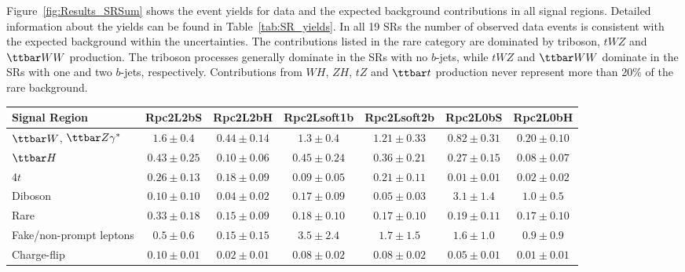 Figure~\ref{fig:Results_SRSum} shows the event yields for data and the expected background contributions 
in all signal regions. Detailed information about the yields can be found in Table~\ref{tab:SR_yields}.
In all 19 SRs the number of observed data events is consistent with the expected background within the uncertainties. 
The contributions listed in the rare category are dominated by triboson, $tWZ$ and $\ttbar WW$ production.
The triboson processes generally dominate in the SRs with no $b$-jets, while $tWZ$ and $\ttbar WW$
dominate in the SRs with one and two $b$-jets, respectively. Contributions from $WH$, $ZH$, $tZ$ and $\ttbar t$ production 
never represent more than 20\% of the rare background.

\begin{table}
\scriptsize
\begin{center}
\vspace*{-0.035\textwidth}
\begin{tabular}{|l|c|c|c|c|c|c|}
\hline
Signal Region                  & \textbf{Rpc2L2bS} & \textbf{Rpc2L2bH}    & \textbf{Rpc2Lsoft1b} &\textbf{Rpc2Lsoft2b}& \textbf{Rpc2L0bS} & \textbf{Rpc2L0bH}\\
\hline
\hline
$\ttbar W$, $\ttbar Z\gamma^*$ & $1.6\pm0.4$       & $0.44\pm0.14$     & $1.3\pm0.4$       & $1.21\pm0.33$       & $0.82\pm0.31$       & $0.20\pm0.10$  \\
$\ttbar H$                     & $0.43\pm0.25$     & $0.10\pm0.06$     & $0.45\pm0.24$     & $0.36\pm0.21$       & $0.27\pm0.15$       & $0.08\pm0.07$   \\
4$t$                           & $0.26\pm0.13$     & $0.18\pm0.09$     & $0.09\pm0.05$     & $0.21\pm0.11$       & $0.01\pm0.01$       & $0.02\pm0.02$   \\
Diboson                        & $0.10\pm0.10$     & $0.04\pm0.02$     & $0.17\pm0.09$     & $0.05\pm0.03$       & $3.1\pm1.4$         & $1.0\pm0.5$   \\
Rare                           & $0.33\pm0.18$     & $0.15\pm0.09$     & $0.18\pm0.10$     & $0.17\pm0.10$       & $0.19\pm0.11$       & $0.17\pm0.10$   \\
Fake/non-prompt leptons        & $0.5\pm0.6$       & $0.15\pm0.15$     & $3.5\pm2.4$       & $1.7\pm1.5$         & $1.6\pm1.0$         & $0.9\pm0.9$   \\
Charge-flip                    & $0.10\pm0.01$     & $0.02\pm0.01$     & $0.08\pm0.02$     & $0.08\pm0.02$       & $0.05\pm0.01$       & $0.01\pm0.01$   \\ 

\end{tabular}
\end{center}
\end{table}
